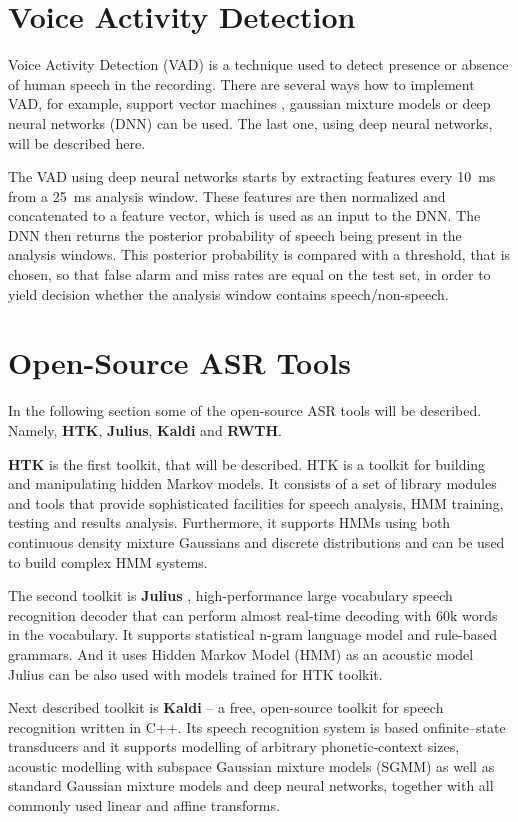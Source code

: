 \section{Voice Activity Detection}
Voice Activity Detection (VAD) is a technique used to detect presence or absence of human speech in the recording.
There are several ways how to implement VAD,
  for example, support vector machines \cite{mesgarani2006discrimination}, gaussian mixture models \cite{ng2012developing} or deep neural networks (DNN) \cite{ryant2013speech} can be used.
The last one, using deep neural networks, will be described here.

The VAD using deep neural networks starts by extracting features every 10~ms from a 25~ms analysis window.
These features are then normalized and concatenated to a feature vector,
  which is used as an input to the DNN.
The DNN then returns the posterior probability of speech being present in the analysis windows.
This posterior probability is compared with a threshold,
  that is chosen,
  so that false alarm and miss rates are equal on the test set,
  in order to yield decision whether the analysis window contains speech/non-speech.

\section{Open-Source ASR Tools}
In the following section some of the open-source ASR tools will be described.
Namely, \textbf{HTK}, \textbf{Julius}, \textbf{Kaldi} and \textbf{RWTH}.

\textbf{HTK} \cite{young1997htk} is the first toolkit, that will be described.
HTK is a toolkit for building and manipulating hidden Markov models.
It consists of a set of library modules and tools that provide sophisticated facilities for speech analysis, HMM training, testing and results analysis.
Furthermore, it supports HMMs using both continuous density mixture Gaussians and discrete distributions and can be used to build complex HMM systems.

The second toolkit is \textbf{Julius} \cite{lee2001julius}, high-performance large vocabulary speech recognition decoder
  that can perform almost real-time decoding with 60k words in the vocabulary.
It supports statistical n-gram language model and rule-based grammars.
And it uses Hidden Markov Model (HMM) as an acoustic model
Julius can be also used with models trained for HTK toolkit.

Next described toolkit is \textbf{Kaldi} \cite{povey2011kaldi} -- a free, open-source toolkit for speech recognition written in C++.
Its speech recognition system is based on\linebreak finite--state transducers
  and it supports modelling of arbitrary phonetic-context sizes,
  acoustic modelling with subspace Gaussian mixture models (SGMM)
  as well as standard Gaussian mixture models and deep neural networks,
  together with all commonly used linear and affine transforms.

